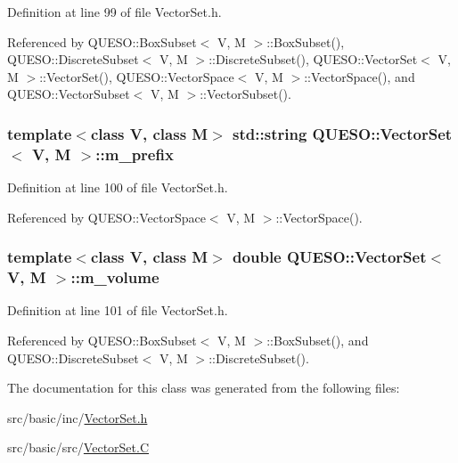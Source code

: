 Definition at line 99 of file Vector\-Set.\-h.



Referenced by Q\-U\-E\-S\-O\-::\-Box\-Subset$<$ V, M $>$\-::\-Box\-Subset(), Q\-U\-E\-S\-O\-::\-Discrete\-Subset$<$ V, M $>$\-::\-Discrete\-Subset(), Q\-U\-E\-S\-O\-::\-Vector\-Set$<$ V, M $>$\-::\-Vector\-Set(), Q\-U\-E\-S\-O\-::\-Vector\-Space$<$ V, M $>$\-::\-Vector\-Space(), and Q\-U\-E\-S\-O\-::\-Vector\-Subset$<$ V, M $>$\-::\-Vector\-Subset().

\hypertarget{class_q_u_e_s_o_1_1_vector_set_a472995c02b59c8f3cd77230b39535cca}{
\subsubsection[{m\-\_\-prefix}]{\setlength{\rightskip}{0pt plus 5cm}template$<$class V, class M$>$ std\-::string {\bf Q\-U\-E\-S\-O\-::\-Vector\-Set}$<$ V, M $>$\-::m\-\_\-prefix\hspace{0.3cm}{\ttfamily [protected]}}}\label{class_q_u_e_s_o_1_1_vector_set_a472995c02b59c8f3cd77230b39535cca}


Definition at line 100 of file Vector\-Set.\-h.



Referenced by Q\-U\-E\-S\-O\-::\-Vector\-Space$<$ V, M $>$\-::\-Vector\-Space().

\hypertarget{class_q_u_e_s_o_1_1_vector_set_acd5cdcdbcbbce29daec684437f511e9f}{
\subsubsection[{m\-\_\-volume}]{\setlength{\rightskip}{0pt plus 5cm}template$<$class V, class M$>$ double {\bf Q\-U\-E\-S\-O\-::\-Vector\-Set}$<$ V, M $>$\-::m\-\_\-volume\hspace{0.3cm}{\ttfamily [protected]}}}\label{class_q_u_e_s_o_1_1_vector_set_acd5cdcdbcbbce29daec684437f511e9f}


Definition at line 101 of file Vector\-Set.\-h.



Referenced by Q\-U\-E\-S\-O\-::\-Box\-Subset$<$ V, M $>$\-::\-Box\-Subset(), and Q\-U\-E\-S\-O\-::\-Discrete\-Subset$<$ V, M $>$\-::\-Discrete\-Subset().



The documentation for this class was generated from the following files\-:\begin{DoxyCompactItemize}
\item 
src/basic/inc/\hyperlink{_vector_set_8h}{Vector\-Set.\-h}\item 
src/basic/src/\hyperlink{_vector_set_8_c}{Vector\-Set.\-C}\end{DoxyCompactItemize}
